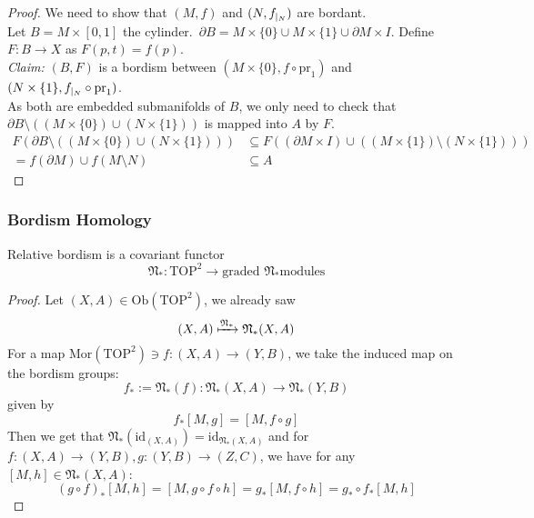 \documentclass[a4paper,12pt]{article}
\begin{document}
\begin{proof}\cite{tomdieck}
    We need to show that \((M,f)\) and \((N,f_{|_{N}})\) are bordant.\\
    Let \(B=M\times [0,1]\) the cylinder.\ \(\partial B= M\times\{0\}\cup M\times\{1\}\cup \partial M\times I\). Define \(F:B\to X\) as \(F(p,t)=f(p)\).\\
    \textit{Claim:} \((B,F)\) is a bordism between \((M\times \{0\},f\circ\mathrm{pr}_1)\) and \((N\times \{1\}, f_{|_{N}}\circ\mathrm{pr}_1)\).\\
    As both are embedded submanifolds of \(B\), we only need to check that \(\partial B\setminus((M\times \{0\})\cup (N\times\{1\}))\) is mapped into \(A\) by \(F\).
    \begin{align*}
        F(\partial B\setminus((M\times \{0\})\cup (N\times\{1\})))&\subseteq F((\partial M\times I)\cup ((M\times\{1\})\setminus (N\times \{1\})))\\
        =f(\partial M)\cup f(M\setminus N)&\subseteq A
    \end{align*}
\end{proof}

\subsubsection{Bordism Homology}

\begin{lemma}\cite[II, Satz 3.2]{brocker}\label{functoriality}
    Relative bordism is a covariant functor \[\mathfrak{N}_\ast:\mathrm{TOP}^2\to\text{graded \(\mathfrak{N}_\ast\)modules}\]
\end{lemma}

\begin{proof}\cite{brocker} 
    Let \((X,A)\in\mathrm{Ob}(\mathrm{TOP}^2)\), we already saw
    \[(X,A)\xmapsto{\mathfrak{N}_\ast}\mathfrak{N}_\ast(X,A)\]
    For a map \(\mathrm{Mor}(\mathrm{TOP}^2)\ni f:(X,A)\to(Y,B)\), we take the induced map on the bordism groups:
    \[f_\ast:=\mathfrak{N}_\ast(f):\mathfrak{N}_\ast(X,A)\to\mathfrak{N}_\ast(Y,B)\]
    given by 
    \[f_\ast[M,g] = [M,f\circ g]\]
    Then we get that \(\mathfrak{N}_\ast(\mathrm{id}_{(X,A)})=\mathrm{id}_{\mathfrak{N}_\ast(X,A)}\) and for \(f:(X,A)\to(Y,B), g:(Y,B)\to(Z,C)\), we have for any \([M,h]\in\mathfrak{N}_\ast(X,A)\):
    \[{(g\circ f)}_{\ast}[M,h]=[M,g\circ f\circ h]=g_\ast[M,f\circ h]=g_\ast\circ f_\ast[M,h]\]
\end{proof}
\end{document}

